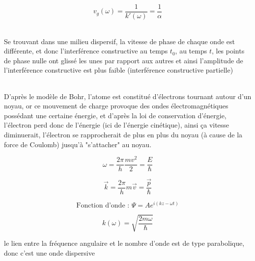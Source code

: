 \documentclass	[11pt, a4paper, openany]{book}
\begin{document}
$$ v_g(\omega) = \dfrac{1}{k'(\omega)} = \dfrac{1}{\alpha} $$

\ \\ Se trouvant dans une milieu dispersif, la vitesse de phase de chaque onde est différente, et donc l'interférence constructive au temps $t_0$, au temps $t$, les points de phase nulle ont glissé les unes par rapport aux autres et ainsi l'amplitude de l'interférence constructive est plus faible (interférence constructive partielle)
\vspace{1cm}

\ \\ D'après le modèle de Bohr, l'atome est constitué d'électrons tournant autour d'un noyau, or ce mouvement de charge provoque des ondes électromagnétiques possédant une certaine énergie, et d'après la loi de conservation d'énergie, l'électron perd donc de l'énergie (ici de l'énergie cinétique), ainsi ça vitesse diminuerait, l'électron se rapprocherait de plus en plus du noyau (à cause de la force de Coulomb) jusqu'à "s'attacher" au noyau.
\vspace{1cm}



$$ \omega = \dfrac{2\pi}{h}\dfrac{mv^2}{2} = \dfrac{E}{\hbar} $$

$$ \vec k = \dfrac{2\pi}{h}m\vec v = \dfrac{\vec p}{\hbar} $$

$$ \text{Fonction d'onde : } \Psi = Ae^{i(kz-\omega t)} $$


$$ k(\omega) = \sqrt{\dfrac{2m\omega}{\hbar}} $$


le lien entre la fréquence angulaire et le
nombre d'onde est de type parabolique, donc c'est une onde dispersive
\end{document}
